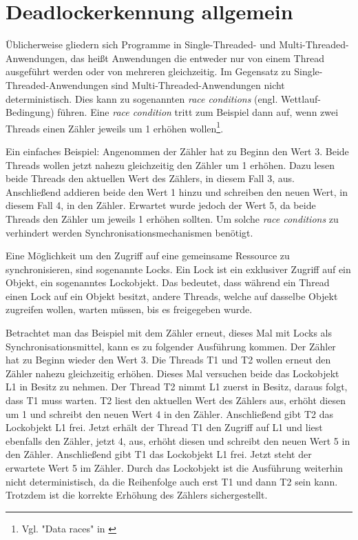 \section{Deadlockerkennung allgemein}
\label{section:Deadlockerkennung allgemein}
Üblicherweise gliedern sich Programme in  Single-Threaded- und
Multi-Threaded-Anwendungen, das heißt Anwendungen die entweder nur von einem
Thread ausgeführt werden oder von mehreren gleichzeitig. Im Gegensatz zu
Single-Threaded-Anwendungen sind Multi-Threaded-Anwendungen nicht
deterministisch. Dies kann zu sogenannten \emph{race conditions} (engl.
Wettlauf-Bedingung) führen. Eine \emph{race condition} tritt zum Beispiel dann
auf, wenn zwei Threads einen Zähler jeweils um 1 erhöhen wollen\footnote{Vgl.
"Data races" in \autocite[70]{netzer1992race}}.

Ein einfaches Beispiel: Angenommen der Zähler hat zu Beginn den Wert 3. Beide
Threads wollen jetzt nahezu gleichzeitig den Zähler um 1 erhöhen. Dazu lesen
beide Threads den aktuellen Wert des Zählers, in diesem Fall 3, aus.
Anschließend addieren beide den Wert 1 hinzu und schreiben den neuen Wert, in
diesem Fall 4, in den Zähler. Erwartet wurde jedoch der Wert 5, da beide Threads
den Zähler um jeweils 1 erhöhen sollten. Um solche \emph{race conditions} zu
verhindert werden Synchronisationsmechanismen benötigt.

Eine Möglichkeit um den Zugriff auf eine gemeinsame Ressource zu
synchronisieren, sind sogenannte Locks. Ein Lock ist ein exklusiver Zugriff auf
ein Objekt, ein sogenanntes Lockobjekt. Das bedeutet, dass während ein Thread
einen Lock auf ein Objekt besitzt, andere Threads, welche auf dasselbe Objekt
zugreifen wollen, warten müssen, bis es freigegeben wurde.

Betrachtet man das Beispiel mit dem Zähler erneut, dieses Mal mit Locks als
Synchronisationsmittel, kann es zu folgender Ausführung kommen. Der Zähler hat
zu Beginn wieder den Wert 3. Die Threads \textrm{T1} und \textrm{T2} wollen
erneut den Zähler nahezu gleichzeitig erhöhen. Dieses Mal versuchen beide das
Lockobjekt \textrm{L1} in Besitz zu nehmen. Der Thread \textrm{T2} nimmt
\textrm{L1} zuerst in Besitz, daraus folgt, dass \textrm{T1} muss warten. \textrm{T2}
liest den aktuellen Wert des Zählers aus, erhöht diesen um 1 und schreibt den
neuen Wert 4 in den Zähler. Anschließend gibt \textrm{T2} das Lockobjekt
\textrm{L1} frei. Jetzt erhält der Thread \textrm{T1} den Zugriff auf
\textrm{L1} und liest ebenfalls den Zähler, jetzt 4, aus, erhöht diesen und
schreibt den neuen Wert 5 in den Zähler. Anschließend gibt \textrm{T1} das
Lockobjekt \textrm{L1} frei. Jetzt steht der erwartete Wert 5 im Zähler. Durch
das Lockobjekt ist die Ausführung weiterhin nicht deterministisch, da die
Reihenfolge auch erst \textrm{T1} und dann \textrm{T2} sein kann. Trotzdem ist
die korrekte Erhöhung des Zählers sichergestellt.

